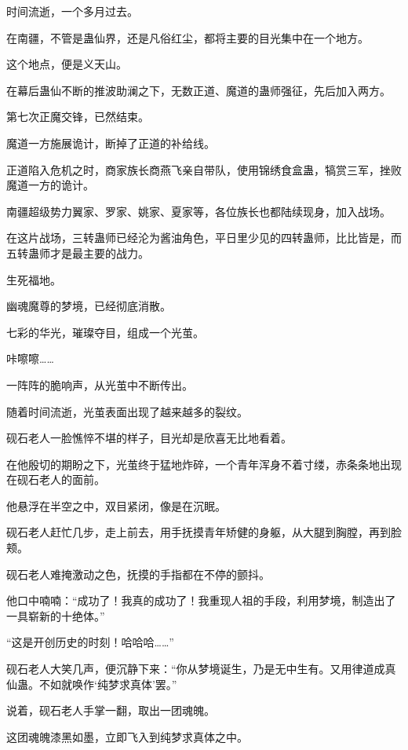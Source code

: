 
\begin{this_body}

时间流逝，一个多月过去。

在南疆，不管是蛊仙界，还是凡俗红尘，都将主要的目光集中在一个地方。

这个地点，便是义天山。

在幕后蛊仙不断的推波助澜之下，无数正道、魔道的蛊师强征，先后加入两方。

第七次正魔交锋，已然结束。

魔道一方施展诡计，断掉了正道的补给线。

正道陷入危机之时，商家族长商燕飞亲自带队，使用锦绣食盒蛊，犒赏三军，挫败魔道一方的诡计。

南疆超级势力翼家、罗家、姚家、夏家等，各位族长也都陆续现身，加入战场。

在这片战场，三转蛊师已经沦为酱油角色，平日里少见的四转蛊师，比比皆是，而五转蛊师才是最主要的战力。

生死福地。

幽魂魔尊的梦境，已经彻底消散。

七彩的华光，璀璨夺目，组成一个光茧。

咔嚓嚓……

一阵阵的脆响声，从光茧中不断传出。

随着时间流逝，光茧表面出现了越来越多的裂纹。

砚石老人一脸憔悴不堪的样子，目光却是欣喜无比地看着。

在他殷切的期盼之下，光茧终于猛地炸碎，一个青年浑身不着寸缕，赤条条地出现在砚石老人的面前。

他悬浮在半空之中，双目紧闭，像是在沉眠。

砚石老人赶忙几步，走上前去，用手抚摸青年矫健的身躯，从大腿到胸膛，再到脸颊。

砚石老人难掩激动之色，抚摸的手指都在不停的颤抖。

他口中喃喃：“成功了！我真的成功了！我重现人祖的手段，利用梦境，制造出了一具崭新的十绝体。”

“这是开创历史的时刻！哈哈哈……”

砚石老人大笑几声，便沉静下来：“你从梦境诞生，乃是无中生有。又用律道成真仙蛊。不如就唤作‘纯梦求真体’罢。”

说着，砚石老人手掌一翻，取出一团魂魄。

这团魂魄漆黑如墨，立即飞入到纯梦求真体之中。


\end{this_body}
